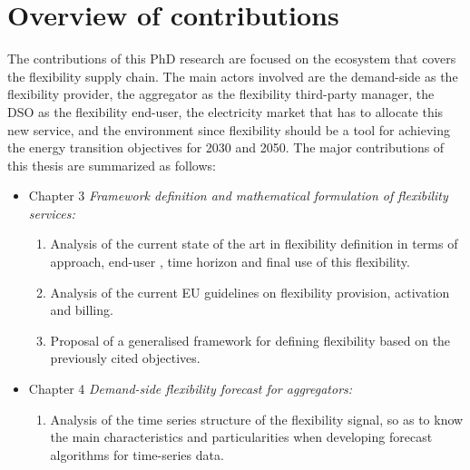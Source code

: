 \section{Overview of contributions}
The contributions of this PhD research are focused on the ecosystem that covers the flexibility supply chain. The main actors involved are the demand-side as the flexibility provider, the aggregator as the flexibility third-party manager, the DSO as the flexibility end-user, the electricity market that has to allocate this new service, and the environment since flexibility should be a tool for achieving the energy transition objectives for 2030 and 2050. The major contributions of this thesis are summarized as follows:  
\begin{itemize}
\item Chapter 3 \textit{Framework definition and mathematical formulation of flexibility services:} 
	\begin{enumerate}
		\item Analysis of the current state of the art in flexibility definition in terms of approach, end-user , time horizon and final use of this flexibility. 
		\item Analysis of the current EU guidelines on flexibility provision, activation and billing. 
		\item Proposal of a generalised framework for defining flexibility based on the previously cited objectives. 
	\end{enumerate}
\item Chapter 4 \textit{Demand-side flexibility forecast for aggregators:} 
	\begin{enumerate}
		\item Analysis of the time series structure of the flexibility signal, so as to know the main characteristics and particularities when developing forecast algorithms for time-series data. 

\end{enumerate}
\end{itemize}
